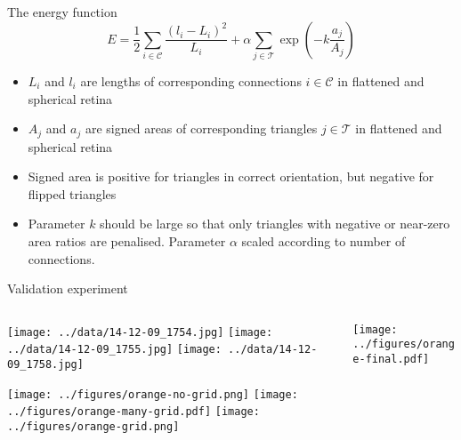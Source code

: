 \documentclass[final,hyperref={pdfpagelabels=false}]{beamer}
\begin{document}
\begin{frame}{}
\begin{columns}[T]
\begin{column}{.33\linewidth}
       \begin{block}{The energy function}
         \begin{displaymath}
           E = \frac{1}{2} \sum_{i\in\mathcal{C}} \frac{(l_i -
             L_i)^2}{L_i}  + \alpha\sum_{j\in\mathcal{T}} \exp\left(-k\frac{a_j}{A_j}\right)
         \end{displaymath}
         \begin{itemize}
         \item $L_i$ and $l_i$ are lengths of corresponding
           connections $i\in\mathcal{C}$ in flattened and spherical
           retina
         \item $A_j$ and $a_j$ are signed areas of corresponding triangles
           $j\in\mathcal{T}$ in flattened and spherical retina
         \item Signed area is positive for triangles in correct
           orientation, but negative for flipped triangles
         \item Parameter $k$ should be large so that only triangles
           with negative or near-zero area ratios are
           penalised. Parameter $\alpha$ scaled according to number of
           connections.
         \end{itemize}
       \end{block}



      \begin{block}{Validation experiment}
        \begin{columns}
          \begin{column}{0.7\linewidth}
          \texttt{[image: ../data/14-12-09\_1754.jpg]}
          \texttt{[image: ../data/14-12-09\_1755.jpg]}
          \texttt{[image: ../data/14-12-09\_1758.jpg]}

          \texttt{[image: ../figures/orange-no-grid.png]}
          \texttt{[image: ../figures/orange-many-grid.pdf]}
          \texttt{[image: ../figures/orange-grid.png]}

          \end{column}

          \begin{column}{0.23\linewidth}
          \texttt{[image: ../figures/orange-final.pdf]}


\end{column}
\end{columns}
\end{block}
\end{column}
\end{columns}
\end{frame}
\end{document}
